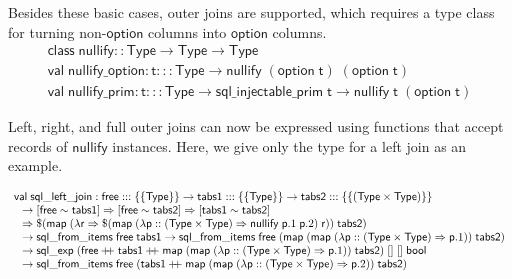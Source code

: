\documentclass{article}
\newcommand{\mt}[1]{\mathsf{#1}}
\newcommand{\rc}{+ \hspace{-.075in} + \;}
\begin{document}
Besides these basic cases, outer joins are supported, which requires a type class for turning non-$\mt{option}$ columns into $\mt{option}$ columns.
$$\begin{array}{l}
  \mt{class} \; \mt{nullify} :: \mt{Type} \to \mt{Type} \to \mt{Type} \\
  \mt{val} \; \mt{nullify\_option} : \mt{t} ::: \mt{Type} \to \mt{nullify} \; (\mt{option} \; \mt{t}) \; (\mt{option} \; \mt{t}) \\
  \mt{val} \; \mt{nullify\_prim} : \mt{t} ::: \mt{Type} \to \mt{sql\_injectable\_prim} \; \mt{t} \to \mt{nullify} \; \mt{t} \; (\mt{option} \; \mt{t})
\end{array}$$

Left, right, and full outer joins can now be expressed using functions that accept records of $\mt{nullify}$ instances.  Here, we give only the type for a left join as an example.

$$\begin{array}{l}
 \mt{val} \; \mt{sql\_left\_join} : \mt{free} ::: \{\{\mt{Type}\}\} \to \mt{tabs1} ::: \{\{\mt{Type}\}\} \to \mt{tabs2} ::: \{\{(\mt{Type} \times \mt{Type})\}\} \\
  \hspace{.1in} \to [\mt{free} \sim \mt{tabs1}] \Rightarrow [\mt{free} \sim \mt{tabs2}] \Rightarrow [\mt{tabs1} \sim \mt{tabs2}] \\
 \hspace{.1in} \Rightarrow \$(\mt{map} \; (\lambda \mt{r} \Rightarrow \$(\mt{map} \; (\lambda \mt{p} :: (\mt{Type} \times \mt{Type}) \Rightarrow \mt{nullify} \; \mt{p}.1 \; \mt{p}.2) \; \mt{r})) \; \mt{tabs2}) \\
 \hspace{.1in} \to \mt{sql\_from\_items} \; \mt{free} \; \mt{tabs1} \to \mt{sql\_from\_items} \; \mt{free} \; (\mt{map} \; (\mt{map} \; (\lambda \mt{p} :: (\mt{Type} \times \mt{Type}) \Rightarrow \mt{p}.1)) \; \mt{tabs2}) \\
 \hspace{.1in} \to \mt{sql\_exp} \; (\mt{free} \rc \mt{tabs1} \rc \mt{map} \; (\mt{map} \; (\lambda \mt{p} :: (\mt{Type} \times \mt{Type}) \Rightarrow \mt{p}.1)) \; \mt{tabs2}) \; [] \; [] \; \mt{bool} \\
 \hspace{.1in} \to \mt{sql\_from\_items} \; \mt{free} \; (\mt{tabs1} \rc \mt{map} \; (\mt{map} \; (\lambda \mt{p} :: (\mt{Type} \times \mt{Type}) \Rightarrow \mt{p}.2)) \; \mt{tabs2})
\end{array}$$
\end{document}
